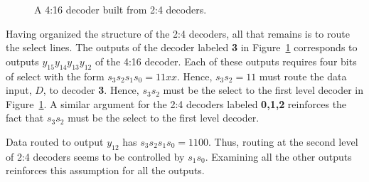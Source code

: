 \begin{figure}[ht]
\caption{A 4:16 decoder built from 2:4 decoders.} 
\label{fig:BigDecoder}
\end{figure}

Having organized the structure of the 2:4 decoders, all that remains 
is to route the select lines.  The outputs of the decoder labeled 
{\bf 3} in Figure~\ref{fig:BigDecoder} corresponds to outputs 
$y_{15} y_{14} y_{13} y_{12}$ 
of the 4:16 decoder.  Each of these outputs requires four bits of 
select with the form $s_3 s_2 s_1 s_0 = 11xx$.  Hence, $s_3 s_2 = 11$ 
must route the data input, $D$, to decoder {\bf 3}.  Hence, $s_3 s_2$ 
must be the select to the first level decoder in 
Figure~\ref{fig:BigDecoder}.   A similar argument for the 2:4 decoders 
labeled {\bf 0,1,2} reinforces the fact that $s_3 s_2$ must be the select 
to the first level decoder.  

Data routed to output $y_{12}$ has $s_3 s_2 s_1 s_0 = 1100$.  Thus, routing
at the second level of 2:4 decoders seems to be controlled by $s_1 s_0$.
Examining all the other outputs reinforces this assumption for all
the outputs.


